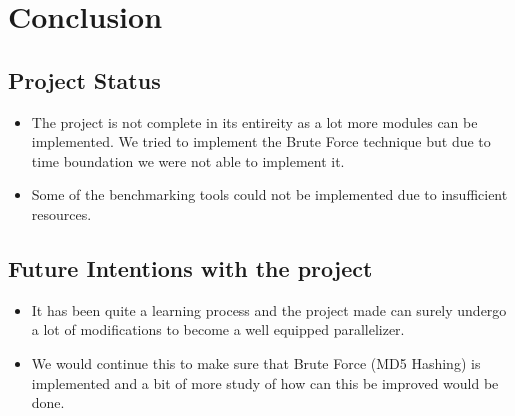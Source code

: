 \chapter{Conclusion}

\section{Project Status}
\begin{itemize}
\item The project is not complete in its entireity as a lot more modules can be implemented. We tried to implement the Brute Force technique but due to time boundation we were not able to implement it.
\item Some of the benchmarking tools could not be implemented due to insufficient resources.
\end{itemize}

\section{Future Intentions with the project}
\begin{itemize}
\item It has been quite a learning process and the project made can surely undergo a lot of modiﬁcations to become a well equipped parallelizer.
\item We would continue this to make sure that Brute Force (MD5 Hashing) is implemented and a bit of more study of how can this be improved would be done.
\end{itemize}
